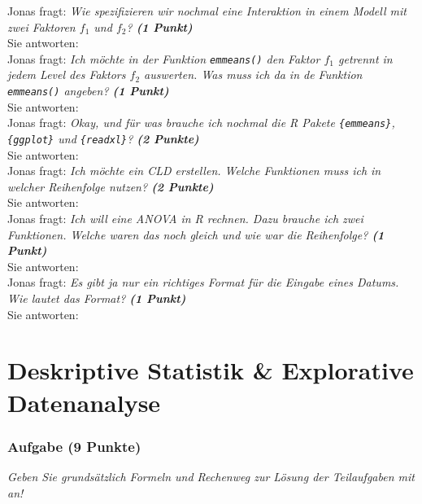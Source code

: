 \documentclass[a4paper, 9pt]{scrartcl}\usepackage[]{graphicx}\usepackage[]{xcolor}
\begin{document}
Jonas fragt: \textit{Wie spezifizieren wir nochmal eine Interaktion in einem Modell mit zwei Faktoren $f_1$ und $f_2$? \textbf{(1 Punkt)}}\\[1ex]
Sie antworten:\\[6.5Ex]

Jonas fragt: \textit{Ich möchte in der Funktion \texttt{emmeans()} den Faktor $f_1$ getrennt in jedem Level des Faktors $f_2$ auswerten. Was muss ich da in de Funktion \texttt{emmeans()} angeben? \textbf{(1 Punkt)}}\\[1ex]
Sie antworten:\\[6.5Ex]

Jonas fragt: \textit{Okay, und für was brauche ich nochmal die R Pakete  \texttt{\{emmeans\}}, \texttt{\{ggplot\}} und \texttt{\{readxl\}}? \textbf{(2 Punkte)}}\\[1ex]
Sie antworten:\\[6.5Ex]

Jonas fragt: \textit{Ich möchte ein CLD erstellen. Welche Funktionen muss ich in welcher Reihenfolge nutzen? \textbf{(2 Punkte)}}\\[1ex]
Sie antworten:\\[6.5Ex]

Jonas fragt: \textit{Ich will eine ANOVA in R rechnen. Dazu brauche ich zwei Funktionen. Welche waren das noch gleich und wie war die Reihenfolge? \textbf{(1 Punkt)}}\\[1ex]
Sie antworten:\\[6.5Ex]

Jonas fragt: \textit{Es gibt ja nur ein richtiges Format für die Eingabe eines Datums. Wie lautet das Format? \textbf{(1 Punkt)}}\\[1ex]
Sie antworten:\\[6.5Ex]



 
\clearpage
\part{Deskriptive Statistik \& Explorative Datenanalyse}

\section{Aufgabe \hfill (9 Punkte)}

\textit{Geben Sie grundsätzlich Formeln und Rechenweg zur Lösung der Teilaufgaben mit an!} \\[1Ex]
 
\end{document}
